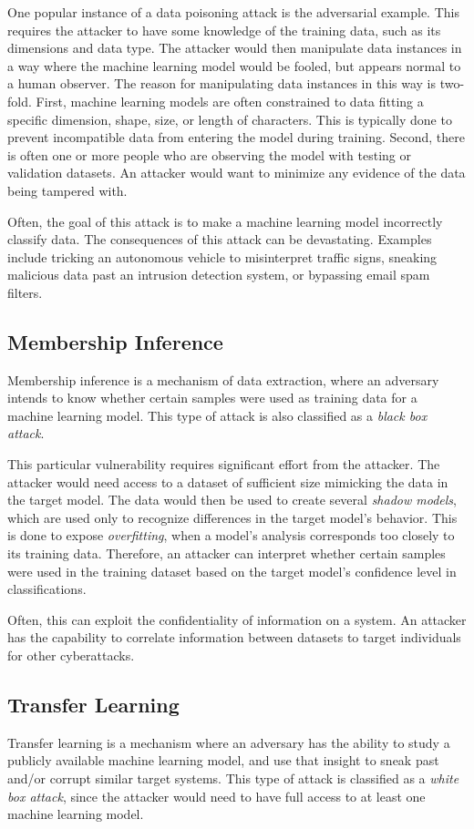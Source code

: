 \documentclass[11pt,conference]{IEEEtran}
\begin{document}
One popular instance of a data poisoning attack is the adversarial
example. This requires the attacker to have some knowledge of the
training data, such as its dimensions and data type. The attacker would then
manipulate data instances in a way where the machine learning model would
be fooled, but appears normal to a human observer. The reason for manipulating
data instances in this way is two-fold. First, machine learning models are
often constrained to data fitting a specific dimension, shape, size, or length
of characters. This is typically done to prevent incompatible data from
entering the model during training. Second, there is often one or more people
who are observing the model with testing or validation datasets. An attacker
would want to minimize any evidence of the data being tampered with.

Often, the goal of this
attack is to make a machine learning model incorrectly classify data. The
consequences of this attack can be devastating. Examples include tricking an
autonomous vehicle to misinterpret traffic signs, sneaking malicious data past an
intrusion detection system, or bypassing email spam filters.

\subsection{Membership Inference}
Membership inference is a mechanism of data extraction, where an adversary
intends to know whether certain samples were used as training data for a
machine learning model. This type of attack is also classified as a \emph{black box attack}.

This particular vulnerability requires significant effort from the attacker.
The attacker would need access to a dataset of sufficient size mimicking the
data in the target model. The data would then be used to create several
\emph{shadow models}, which are used only to recognize differences
in the target model's behavior. This is done to expose \emph{overfitting}, when a model's analysis corresponds too
closely to its training data. Therefore, an attacker can interpret whether
certain samples were used in the training dataset based on the target model's
confidence level in classifications.

Often, this can exploit the confidentiality of information on a system. An
attacker has the capability to correlate information between datasets to target
individuals for other cyberattacks.

\subsection{Transfer Learning}
Transfer learning is a mechanism where an adversary has the ability to study a
publicly available machine learning model, and use that insight to sneak past
and/or corrupt similar target systems. This type of attack is classified as a
\emph{white box attack}, since the attacker would need to have full access to
at least one machine learning model.
\end{document}
